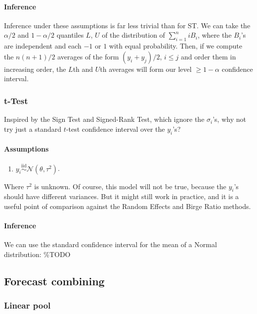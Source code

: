 \documentclass[12pt]{article}
\begin{document}
\paragraph{Inference}\label{inference-4}

Inference under these assumptions is far less trivial than for ST. We can take the $\alpha/2$ and $1-\alpha/2$ quantiles $L$, $U$ of the distribution of $\sum_{i=1}^n iB_i$, where the $B_i$'s are independent and each $-1$ or $1$ with equal probability. Then, if we compute the $n(n+1)/2$ averages of the form $(y_i+y_j)/2$, $i\leq j$ and order them in increasing order, the $L$th and $U$th averages will form our level $\geq 1-\alpha$ confidence interval.

\subsubsection{t-Test}\label{t-test}

Inspired by the Sign Test and Signed-Rank Test, which ignore the $\sigma_i$'s, why not try just a standard $t$-test confidence interval over the $y_i$'s?

\paragraph{Assumptions}\label{assumptions-5}

\begin{enumerate}
\item
  $y_i\overset{\mathrm{iid}}{\sim}\mathcal{N}(\theta,\tau^2)$.
\end{enumerate}

Where $\tau^2$ is unknown. Of course, this model will not be true, because the $y_i$'s should have different variances. But it might still work in practice, and it is a useful point of comparison against the Random Effects and Birge Ratio methods.

\paragraph{Inference}\label{inference-5}

We can use the standard confidence interval for the mean of a Normal distribution:
\%TODO

\subsection{Forecast combining}

\subsubsection{Linear pool}
\end{document}
